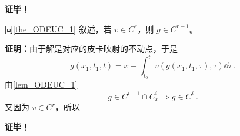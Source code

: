 \textbf{证毕！}
\begin{theorem}{}
同\autoref{the_ODEUC_1} 叙述，若 $v\in C^r $，则 $g\in C^{r-1}$。
\end{theorem}
\textbf{证明：}由于解是对应的皮卡映射的不动点，于是
\begin{equation}
g(x_1,t_1,t)=x+\int_{t_0}^tv(g(x_1,t_1,\tau),\tau)\dd\tau~.
\end{equation}
由\autoref{lem_ODEUC_1} 
\begin{equation}
g\in C^{i-1}\cap C_x^{i}\Rightarrow g\in C^i~.
\end{equation}
又因为 $v\in C^r$，所以


\textbf{证毕！}
